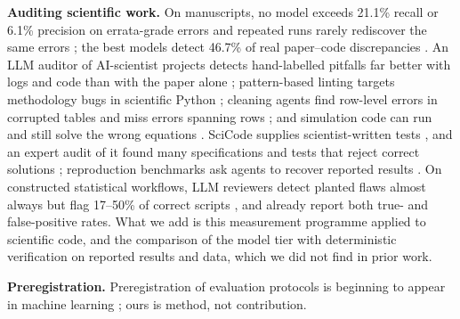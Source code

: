 \textbf{Auditing scientific work.} On manuscripts, no model exceeds 21.1\% recall or 6.1\% precision
on errata-grade errors and repeated runs rarely rediscover the same errors \citep{son2025spot}; the
best models detect 46.7\% of real paper--code discrepancies \citep{baumgartner2026scicoqa}. An LLM
auditor of AI-scientist projects detects hand-labelled pitfalls far better with logs and code than
with the paper alone \citep{luo2025pitfalls}; pattern-based linting targets methodology bugs in
scientific Python \citep{samsonau2026scicodelint}; cleaning agents find row-level errors in corrupted
tables and miss errors spanning rows \citep{bendinelli2025cleaning}; and simulation code can run and
still solve the wrong equations \citep{song2026moose}. SciCode supplies scientist-written tests
\citep{tian2024scicode}, and an expert audit of it found many specifications and tests that reject
correct solutions \citep{hu2026scicodeverified}; reproduction benchmarks ask agents to recover
reported results \citep{siegel2024corebench}. On constructed statistical workflows, LLM reviewers
detect planted flaws almost always but flag 17--50\% of correct scripts \citep{chelate2026replicationtrap},
and \citet{luo2025pitfalls} already report both true- and false-positive rates. What we add is this measurement programme applied to scientific code, and the comparison of the model tier with deterministic verification on reported results and data, which we did not find in prior work.

\textbf{Preregistration.} Preregistration of evaluation protocols is beginning to appear in machine learning
\citep{vaccaro2026prereg, thomas2026phacking}; ours is method, not contribution.
